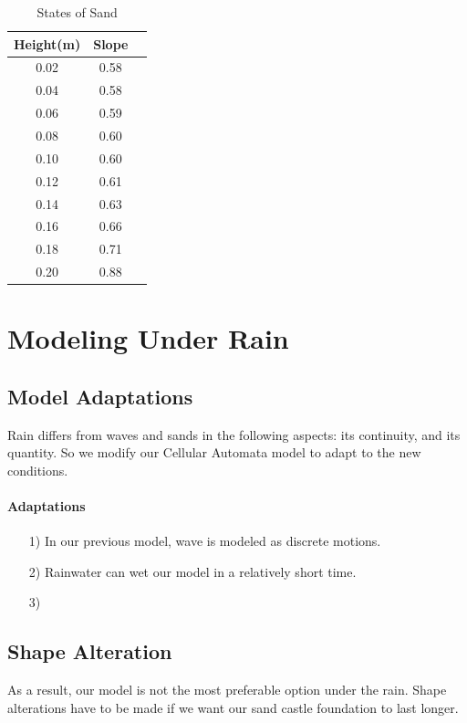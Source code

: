 \documentclass[12pt]{article}
\begin{document}
\begin{table}[H]
	\caption{States of Sand}
	\vspace{10pt}
	\centering
	\begin{tabular}{ccc} 
		\hline
		Height(m) & Slope     \\
		\hline
		0.02            & 0.58     \\
		0.04            & 0.58  \\
		0.06            & 0.59      \\
		0.08            & 0.60    \\
		0.10            & 0.60      \\
		0.12			& 0.61 \\
		0.14  			& 0.63\\
		0.16			& 0.66\\
		0.18			& 0.71\\
		0.20            & 0.88 \\
		\hline
	\end{tabular}
	\label{bs2}
\end{table}
\section{Modeling Under Rain}
\subsection{Model Adaptations}
Rain differs from waves and sands in the following aspects: its continuity, and its quantity. So we modify our Cellular Automata model to adapt to the new conditions.
\paragraph{Adaptations}
\begin{itemize}
    \item [1)]
          In our previous model, wave is modeled as discrete motions.
    \item [2)]
          Rainwater can wet our model in a relatively short time.
    \item [3)]

\end{itemize}
\subsection{Shape Alteration}
As a result, our model is not the most preferable option under the rain. Shape alterations have to be made if we want our sand castle foundation to last longer.
\end{document}
